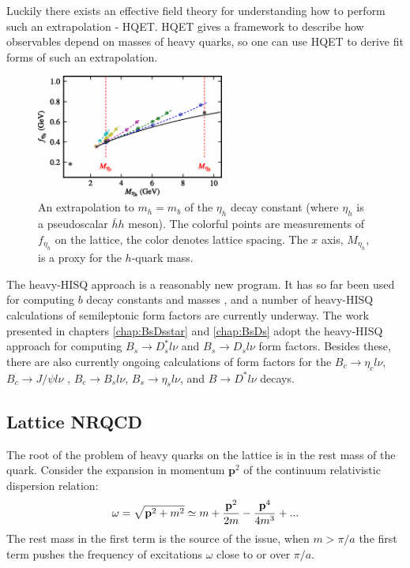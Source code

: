     Luckily there exists an effective field theory for understanding how to perform such an extrapolation - HQET. HQET gives a framework to describe how observables depend on masses of heavy quarks, so one can use HQET to derive fit forms of such an extrapolation.

    \begin{figure}
      \begin{center}
        \includegraphics[width=
          0.55\textwidth]{images/fetah_heavyhisq.png}
      \end{center}
      \vspace{-5pt}
      \caption{An extrapolation to $m_h=m_b$ of the $\eta_h$ decay constant (where $\eta_h$ is a pseudoscalar $\bar{h}h$ meson)\cite{McNeile:2012qf}. The colorful points are measurements of $f_{\eta_h}$ on the lattice, the color denotes lattice spacing. The $x$ axis, $M_{\eta_h}$, is a proxy for the $h$-quark mass. \label{fig:McNeile}}
    \end{figure}

    The heavy-HISQ approach is a reasonably new program. It has so far been used for computing $b$ decay constants and masses \cite{McNeile:2011ng,McNeile:2012qf}, and a number of heavy-HISQ calculations of semileptonic form factors are currently underway. The work presented in chapters \ref{chap:BsDsstar} and \ref{chap:BsDs} adopt the heavy-HISQ approach for computing $B_s\to D_s^*l\nu$ and $B_s\to D_sl\nu$ form factors. Besides these, there are also currently ongoing calculations of form factors for the $B_c\to \eta_cl\nu$, $B_c\to J/\psi l\nu$ \cite{Lytle:2016ixw}, $B_c\to B_sl\nu$, $B_s\to \eta_sl\nu$, and $B\to D^*l\nu$ decays.

    \subsection{Lattice NRQCD}

    The root of the problem of heavy quarks on the lattice is in the rest mass of the quark. Consider the expansion in momentum $\textbf{p}^2$ of the continuum relativistic dispersion relation:
    \begin{align}
      \omega = \sqrt{{\textbf{p}}^2 + m^2} \simeq m + {{\textbf{p}}^2\over 2m} - {{\textbf{p}}^4\over 4m^3} + ...
      \label{eq:rel_expansion}
    \end{align}
The rest mass in the first term is the source of the issue, when $m > \pi/a$ the first term pushes the frequency of excitations $\omega$ close to or  over $\pi/a$.

